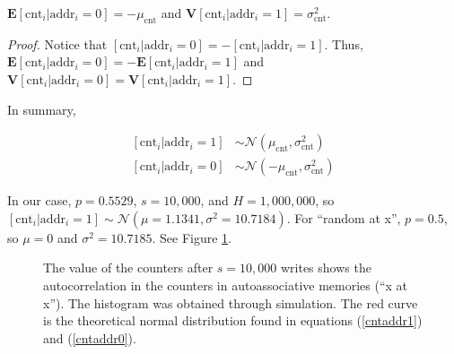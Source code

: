 \begin{theorem}
$\mathbf{E}[\text{cnt}_i | \text{addr}_i = 0] = - \mu_{\text{cnt}}$ and $\mathbf{V}[\text{cnt}_i | \text{addr}_i = 1] = \sigma^2_\text{cnt}$.
\end{theorem}
\begin{proof}
Notice that $[\text{cnt}_i | \text{addr}_i = 0] = -[\text{cnt}_i | \text{addr}_i = 1]$. Thus, $\mathbf{E}[\text{cnt}_i | \text{addr}_i = 0] = -\mathbf{E}[\text{cnt}_i | \text{addr}_i = 1]$ and $\mathbf{V}[\text{cnt}_i | \text{addr}_i = 0] = \mathbf{V}[\text{cnt}_i | \text{addr}_i = 1]$.
\end{proof}

In summary,

\begin{align}
\left[ \text{cnt}_i | \text{addr}_i=1 \right] &\sim \mathcal{N}(\mu_\text{cnt}, \sigma^2_\text{cnt})\label{cntaddr1} \\
\left[ \text{cnt}_i | \text{addr}_i=0 \right] &\sim \mathcal{N}(-\mu_\text{cnt}, \sigma^2_\text{cnt})\label{cntaddr0}
\end{align}

In our case, $p=0.5529$, $s=10,000$, and $H=1,000,000$, so $[\text{cnt}_i | \text{addr}_i=1] \sim \mathcal{N}(\mu=1.1341, \sigma^2 = 10.7184)$. For ``random at x'', $p=0.5$, so $\mu = 0$ and $\sigma^2 = 10.7185$. See Figure \ref{fig:sdm-corr-counters}.

\begin{figure}[h!]
  \centering

  \caption{The value of the counters after $s=10,000$ writes shows the autocorrelation in the counters in autoassociative memories (``x at x''). The histogram was obtained through simulation. The red curve is the theoretical normal distribution found in equations (\ref{cntaddr1}) and (\ref{cntaddr0}).}
  \label{fig:sdm-corr-counters}
\end{figure}


